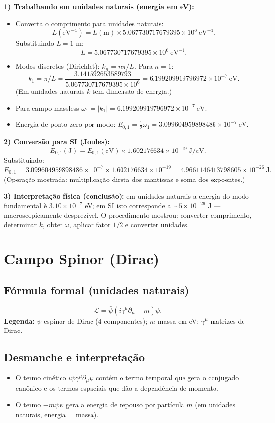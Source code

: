 \documentclass[12pt,a4paper]{article}
\begin{document}
\textbf{1) Trabalhando em unidades naturais (energia em eV):}
\begin{itemize}
  \item Converta o comprimento para unidades naturais: 
  \[ L(\text{eV}^{-1}) = L(\mathrm{m}) \times 5.067730717679395\times10^{6}\ \mathrm{eV^{-1}}. \]
  Substituindo $L=1$ m:
  \[ L = 5.067730717679395\times10^{6}\ \mathrm{eV^{-1}}. \]
  \item Modos discretos (Dirichlet): $k_n = n\pi/L$. Para $n=1$:
  \[ k_1 = \pi / L = \frac{3.141592653589793}{5.067730717679395\times10^{6}} = 6.199209919796972\times10^{-7}\ \mathrm{eV}. \]
  (Em unidades naturais $k$ tem dimensão de energia.)
  \item Para campo massless $\omega_1 = |k_1| = 6.199209919796972\times10^{-7}\ \mathrm{eV}.$
  \item Energia de ponto zero por modo: $E_{0,1} = \tfrac{1}{2}\omega_1 = 3.099604959898486\times10^{-7}\ \mathrm{eV}.$
\end{itemize}

\textbf{2) Conversão para SI (Joules):}
\[ E_{0,1}(\mathrm{J}) = E_{0,1}(\mathrm{eV}) \times 1.602176634\times10^{-19} \ \mathrm{J/eV}. \]
Substituindo:
\[ E_{0,1} = 3.099604959898486\times10^{-7} \times 1.602176634\times10^{-19} = 4.9661146413798605\times10^{-26}\ \mathrm{J}. \]
(Operação mostrada: multiplicação direta dos mantissas e soma dos expoentes.)

\textbf{3) Interpretação física (conclusão):} em unidades naturais a energia do modo fundamental \`e $3.10\times10^{-7}$ eV; em SI isto corresponde a $\sim5\times10^{-26}$ J — macroscopicamente desprezível. O procedimento mostrou: converter comprimento, determinar $k$, obter $\omega$, aplicar fator $1/2$ e converter unidades.

\section{Campo Spinor (Dirac)}
\subsection{Fórmula formal (unidades naturais)}
\begin{equation}\label{lag_dirac}
\mathcal{L} = \bar{\psi}(i\gamma^\mu\partial_\mu - m)\psi.
\end{equation}
\textbf{Legenda:} $\psi$ espinor de Dirac (4 componentes); $m$ massa em eV; $\gamma^\mu$ matrizes de Dirac.

\subsection{Desmanche e interpretação}
\begin{itemize}
  \item O termo cinético $i\bar\psi\gamma^\mu\partial_\mu\psi$ contém o termo temporal que gera o conjugado canônico e os termos espaciais que dão a dependência de momento.
  \item O termo $-m\bar\psi\psi$ gera a energia de repouso por partícula $m$ (em unidades naturais, energia = massa).
\end{itemize}
\end{document}
